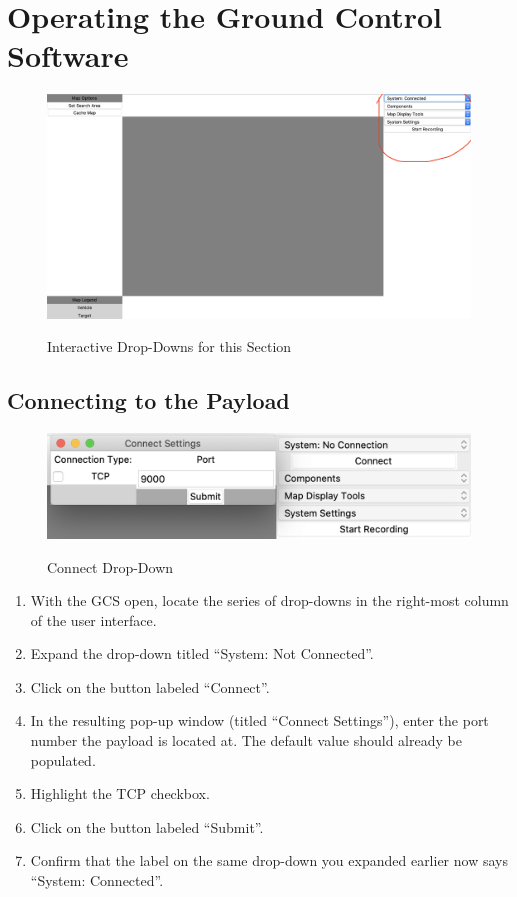 \documentclass{report}
\begin{document}
\chapter{Operating the Ground Control Software}
	\begin{figure}[ht]
		\centering
		\caption{Interactive Drop-Downs for this Section}
		\includegraphics[width=\textwidth]{right_column_dropdowns.jpg}
		\label{fig:right_column_dd}
	\end{figure}
	\section{Connecting to the Payload}
		\begin{figure}[htb]
			\centering
			\caption{Connect Drop-Down}
			\includegraphics[scale=0.5]{connect_button.jpg}
			\label{fig:connect_button}
		\end{figure}
		\begin{enumerate}
			\item With the GCS open, locate the series of drop-downs in the right-most column of the user interface.
			\item Expand the drop-down titled ``System: Not Connected''.
			\item Click on the button labeled ``Connect''.
			\item In the resulting pop-up window (titled ``Connect Settings''), enter the port number the payload is located at. The default value should already be populated. 
			\item Highlight the TCP checkbox.
			\item Click on the button labeled ``Submit''.
			\item Confirm that the label on the same drop-down you expanded earlier now says ``System: Connected''.
		\end{enumerate}
\end{document}
